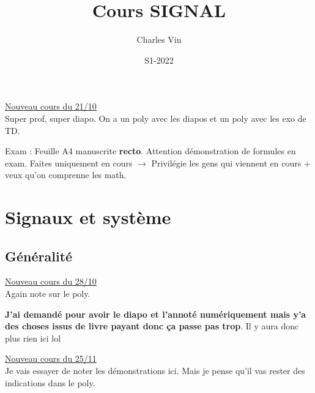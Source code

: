 \documentclass{article}
\title{Cours SIGNAL}
\author{Charles Vin}
\date{S1-2022}
\theoremstyle{plain}%
\theoremstyle{definition}
\theoremstyle{remark}
\begin{document}
\maketitle

\underline{Nouveau cours du 21/10} \\

Super prof, super diapo. On a un poly avec les diapos et un poly avec les exo de TD.

Exam : Feuille A4 manuscrite \textbf{recto}. Attention démonstration de formules en exam. Faites uniquement en cours $\rightarrow$ Privilégie les gens qui viennent en cours + veux qu'on comprenne les math.

\section{Signaux et système}
\subsection{Généralité}

\underline{Nouveau cours du 28/10} \\
Again note sur le poly.

\textbf{J'ai demandé pour avoir le diapo et l'annoté numériquement mais y'a des choses issus de livre payant donc ça passe pas trop}. Il y aura donc plus rien ici lol

\underline{Nouveau cours du 25/11} \\
Je vais essayer de noter les démonstrations ici. Mais je pense qu'il vas rester des indications dans le poly.
\end{document}
